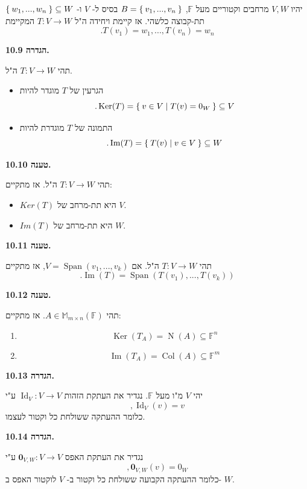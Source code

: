 \documentclass[12pt]{report}
\theoremstyle{plain}
\theoremstyle{definition}
\newcommand{\F}{\mathbb{F}}
\newcommand{\M}{\mathbb{M}}
\newcommand{\0}{\mathbf{0}}
\DeclareMathOperator{\Span}{Span}
\DeclareMathOperator{\Col}{Col}
\DeclareMathOperator{\Null}{N}
\DeclareMathOperator{\Ker}{Ker}
\DeclareMathOperator{\Image}{Im}
\DeclareMathOperator{\Id}{Id}
\begin{document}
יהיו 
$V,W$
מרחבים וקטוריים מעל
$\F$,
$B=\Set{v_1,...,v_n}$
בסיס ל-
$V$
ו-
$\Set{w_1,...,w_n}\subseteq W$
תת-קבוצה כלשהי. אז קיימת ויחידה ה"ל 
$T:V\to W$
המקיימת
$$
.T(v_1)=w_1,...,T(v_n)=w_n
$$
\bigskip
\bigskip

\noindent\textbf{הגדרה 10.9.}

תהי
$T:V\to W$
ה"ל.

\begin{itemize}
\item 
הגרעין של 
$T$
מוגדר להיות
$$
.\Ker(T)=\Set{v\in V|T(v)=0_W}\subseteq V
$$

\item 
התמונה של 
$T$
מוגדרת להיות
$$
.\Image(T)=\Set{T(v)|v\in V}\subseteq W
$$


\end{itemize}
\bigskip
\bigskip

\noindent\textbf{טענה 10.10.}

תהי
$T:V\to W$
ה"ל. אז מתקיים:
\begin{itemize}
    \item 
    $Ker(T)$
    היא תת-מרחב של 
    $V$.


    \item 
    $Im(T)$
    היא תת-מרחב של 
    $W$.

    
\end{itemize}
\bigskip
\bigskip

\noindent\textbf{טענה 10.11.}

תהי
$T:V\to W$
ה"ל. אם
$V=\Span(v_1,...,v_k)$,
אז מתקיים 
$$.\Image(T)=\Span(T(v_1),...,T(v_k))$$
\bigskip
\bigskip

\noindent\textbf{טענה 10.12.}

תהי 
$A\in\M_{m\times n}(\F)$.
אז מתקיים:
\begin{enumerate}[label=\alph*.]
\item
$$\Ker(T_A)=\Null(A)\subseteq \F^n$$

\item
$$\Image(T_A)=\Col(A)\subseteq \F^m$$


\end{enumerate}
\bigskip
\bigskip

\noindent\textbf{הגדרה 10.13.}

יהי
$V$
מ"ו מעל
$\F$.
נגדיר את העתקת הזהות
$\Id_V:V\to V$
ע"י
$$
,\Id_V(v)=v 
$$
כלומר ההעתקה ששולחת כל וקטור לעצמו.
\bigskip
\bigskip

\noindent\textbf{הגדרה 10.14.}

נגדיר את העתקת האפס
$\0_{V,W}:V\to V$
ע"י
$$
,\0_{V,W}(v)=0_W 
$$
כלומר ההעתקה הקבועה ששולחת כל וקטור ב-
$V$
לוקטור האפס ב-
$W$.
\bigskip
\bigskip
\end{document}
